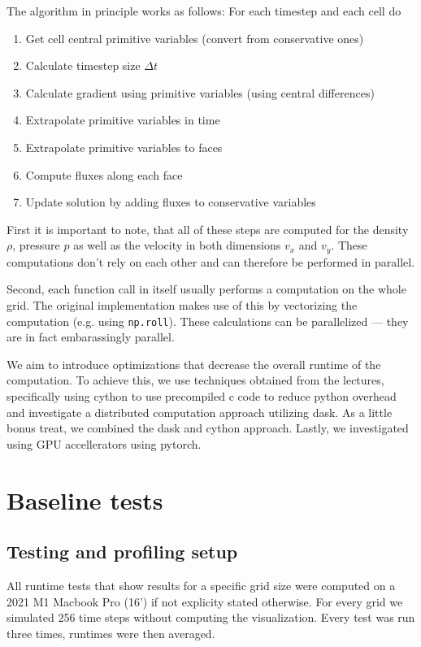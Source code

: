 \documentclass[a4paper,10pt]{article}
\begin{document}
The algorithm in principle works as follows:
For each timestep and each cell do
\begin{enumerate}
  \item Get cell central primitive variables (convert from conservative ones)
  \item Calculate timestep size $\Delta t$
  \item Calculate gradient using primitive variables (using central differences)
  \item Extrapolate primitive variables in time
  \item Extrapolate primitive variables to faces
  \item Compute fluxes along each face
  \item Update solution by adding fluxes to conservative variables
\end{enumerate}

First it is important to note, that all of these steps are computed for the density $\rho$, pressure $p$ as well as the velocity in both dimensions $v_x$ and $v_y$.
These computations don't rely on each other and can therefore be performed in parallel.

Second, each function call in itself usually performs a computation on the whole grid.
The original implementation makes use of this by vectorizing the computation (e.g. using \verb|np.roll|).
These calculations can be parallelized --- they are in fact embarassingly parallel.

We aim to introduce optimizations that decrease the overall runtime of the computation.
To achieve this, we use techniques obtained from the lectures, specifically using cython to use precompiled c code to reduce python overhead and investigate a distributed computation approach utilizing dask.
As a little bonus treat, we combined the dask and cython approach.
Lastly, we investigated using GPU accellerators using pytorch.

\section{Baseline tests}
\subsection{Testing and profiling setup}
All runtime tests that show results for a specific grid size were computed on a 2021 M1 Macbook Pro (16') if not explicity stated otherwise.
For every grid we simulated 256 time steps without computing the visualization.
Every test was run three times, runtimes were then averaged.
\end{document}
